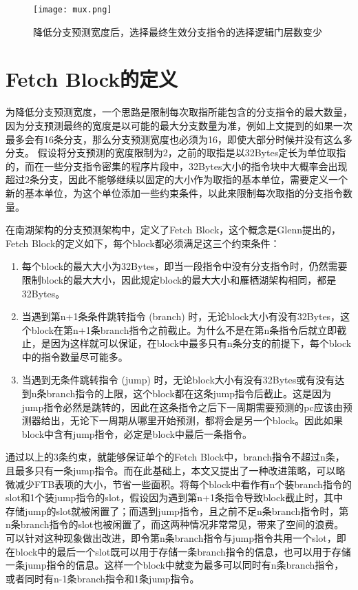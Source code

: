 \begin{figure}[htb]
	\centering
	\setlength\tabcolsep{3pt}  %
	\vspace{5pt} %
	\texttt{[image: mux.png]}
	\caption{降低分支预测宽度后，选择最终生效分支指令的选择逻辑门层数变少}
	\label{fig:figure33}
\end{figure}

\section{Fetch Block的定义}

为降低分支预测宽度，一个思路是限制每次取指所能包含的分支指令的最大数量，因为分支预测最终的宽度是以可能的最大分支数量为准，例如上文提到的如果一次最多会有16条分支，那么分支预测宽度也必须为16，即使大部分时候并没有这么多分支。
假设将分支预测的宽度限制为2，之前的取指是以32Bytes定长为单位取指的，而在一些分支指令密集的程序片段中，32Bytes大小的指令块中大概率会出现超过2条分支，因此不能够继续以固定的大小作为取指的基本单位，需要定义一个新的基本单位，为这个单位添加一些约束条件，以此来限制每次取指的分支指令数量。

在南湖架构的分支预测架构中，定义了Fetch Block，这个概念是Glenn\cite{scalable-frontend}提出的，Fetch Block的定义如下，每个block都必须满足这三个约束条件：

\begin{enumerate}
    \item 每个block的最大大小为32Bytes，即当一段指令中没有分支指令时，仍然需要限制block的最大大小，因此规定block的最大大小和雁栖湖架构相同，都是32Bytes。
    \item 当遇到第n+1条条件跳转指令 (branch) 时，无论block大小有没有32Bytes，这个block在第n+1条branch指令之前截止。为什么不是在第n条指令后就立即截止，是因为这样就可以保证，在block中最多只有n条分支的前提下，每个block中的指令数量尽可能多。
    \item 当遇到无条件跳转指令 (jump) 时，无论block大小有没有32Bytes或有没有达到n条branch指令的上限，这个block都在这条jump指令后截止。这是因为jump指令必然是跳转的，因此在这条指令之后下一周期需要预测的pc应该由预测器给出，无论下一周期从哪里开始预测，都将会是另一个block。因此如果block中含有jump指令，必定是block中最后一条指令。
\end{enumerate}

通过以上的3条约束，就能够保证单个的Fetch Block中，branch指令不超过n条，且最多只有一条jump指令。而在此基础上，本文又提出了一种改进策略，可以略微减少FTB表项的大小，节省一些面积。将每个block中看作有n个装branch指令的slot和1个装jump指令的slot，假设因为遇到第n+1条指令导致block截止时，其中存储jump的slot就被闲置了；而遇到jump指令，且之前不足n条branch指令时，第n条branch指令的slot也被闲置了，而这两种情况非常常见，带来了空间的浪费。可以针对这种现象做出改进，即令第n条branch指令与jump指令共用一个slot，即在block中的最后一个slot既可以用于存储一条branch指令的信息，也可以用于存储一条jump指令的信息。这样一个block中就变为最多可以同时有n条branch指令，或者同时有n-1条branch指令和1条jump指令。

